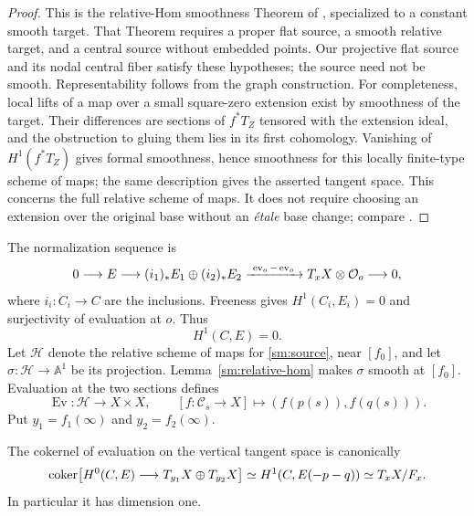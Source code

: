 \begin{proof}
This is the relative-Hom smoothness Theorem of
\cite[Theorem~15]{AraujoKollar2003}, specialized to a constant
smooth target. That Theorem requires a proper flat source,
a smooth relative target, and a central source without embedded
points. Our projective flat source and its nodal central fiber
satisfy these hypotheses; the source need not be smooth.
Representability follows from the graph construction.
For completeness, local lifts of a map over a small square-zero
extension exist by smoothness of the target. Their differences
are sections of $f^*T_Z$ tensored with the extension ideal, and
the obstruction to gluing them lies in its first cohomology.
Vanishing of $H^1(f^*T_Z)$ gives formal smoothness, hence
smoothness for this locally finite-type scheme of maps; the
same description gives the asserted tangent space.
This concerns the full relative scheme of maps. It does not
require choosing an extension over the original base without
an \emph{\'etale} base change; compare
\cite[Warning~16 and Application~17]{AraujoKollar2003}.
\end{proof}

The normalization sequence is
\begin{equation}\label{sm:normalization}
0\longrightarrow E
\longrightarrow (i_1)_*E_1\oplus(i_2)_*E_2
\xrightarrow{\ \operatorname{ev}_o-\operatorname{ev}_o\ }
T_xX\otimes\mathcal O_o\longrightarrow0,
\end{equation}
where $i_i:C_i\to C$ are the inclusions.
Freeness gives $H^1(C_i,E_i)=0$ and surjectivity of evaluation
at $o$. Thus
\begin{equation}\label{sm:unconstrained-vanishing}
H^1(C,E)=0.
\end{equation}
Let $\mathscr H$ denote the relative scheme of maps for
\eqref{sm:source}, near $[f_0]$, and let
$\sigma:\mathscr H\to\mathbb A^1$ be its projection.
Lemma~\ref{sm:relative-hom} makes $\sigma$ smooth at $[f_0]$.
Evaluation at the two sections defines
\[
\operatorname{Ev}:\mathscr H\longrightarrow X\times X,
\qquad [f:\mathscr C_s\to X]\longmapsto(f(p(s)),f(q(s))).
\]
Put $y_1=f_1(\infty)$ and $y_2=f_2(\infty)$.

\begin{lemma}\label{sm:vertical-cokernel}
The cokernel of evaluation on the vertical tangent space is
canonically
\begin{equation}\label{sm:cokernel}
\operatorname{coker}\bigl[
H^0(C,E)\longrightarrow T_{y_1}X\oplus T_{y_2}X
\bigr]
\simeq H^1(C,E(-p-q))
\simeq T_xX/F_x.
\end{equation}
In particular it has dimension one.
\end{lemma}


